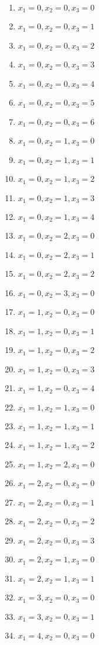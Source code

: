 \begin{enumerate}
  \item $x_1=0,x_2=0,x_3=0$
  \item $x_1=0,x_2=0,x_3=1$
  \item $x_1=0,x_2=0,x_3=2$
  \item $x_1=0,x_2=0,x_3=3$
  \item $x_1=0,x_2=0,x_3=4$
  \item $x_1=0,x_2=0,x_3=5$
  \item $x_1=0,x_2=0,x_3=6$
  \item $x_1=0,x_2=1,x_3=0$
  \item $x_1=0,x_2=1,x_3=1$
  \item $x_1=0,x_2=1,x_3=2$
  \item $x_1=0,x_2=1,x_3=3$
  \item $x_1=0,x_2=1,x_3=4$
  \item $x_1=0,x_2=2,x_3=0$
  \item $x_1=0,x_2=2,x_3=1$
  \item $x_1=0,x_2=2,x_3=2$
  \item $x_1=0,x_2=3,x_3=0$
  \item $x_1=1,x_2=0,x_3=0$
  \item $x_1=1,x_2=0,x_3=1$
  \item $x_1=1,x_2=0,x_3=2$
  \item $x_1=1,x_2=0,x_3=3$
  \item $x_1=1,x_2=0,x_3=4$
  \item $x_1=1,x_2=1,x_3=0$
  \item $x_1=1,x_2=1,x_3=1$
  \item $x_1=1,x_2=1,x_3=2$
  \item $x_1=1,x_2=2,x_3=0$
  \item $x_1=2,x_2=0,x_3=0$
  \item $x_1=2,x_2=0,x_3=1$
  \item $x_1=2,x_2=0,x_3=2$
  \item $x_1=2,x_2=0,x_3=3$
  \item $x_1=2,x_2=1,x_3=0$
  \item $x_1=2,x_2=1,x_3=1$
  \item $x_1=3,x_2=0,x_3=0$
  \item $x_1=3,x_2=0,x_3=1$
  \item $x_1=4,x_2=0,x_3=0$
\end{enumerate}

